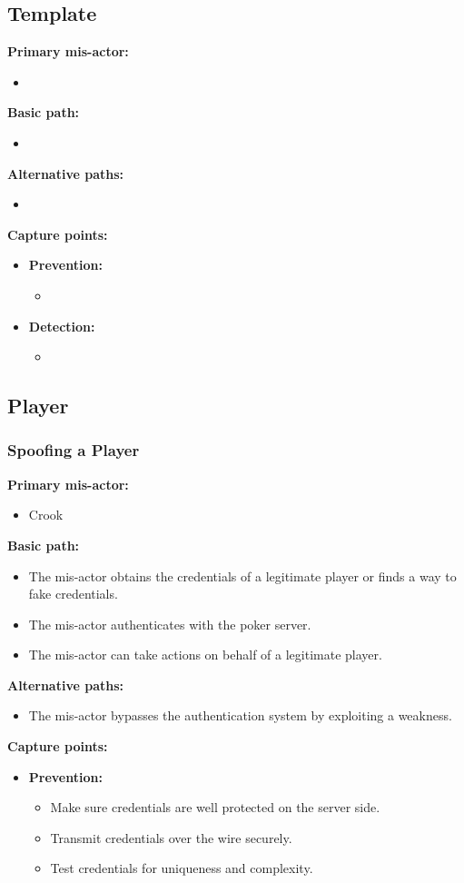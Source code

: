 \documentclass[a4paper,11pt]{report}
\begin{document}
\subsection{Template}
\textbf{Primary mis-actor:}
\begin{itemize}
\item 
\end{itemize}
\textbf{Basic path:}
\begin{itemize}
\item 
\end{itemize}
\textbf{Alternative paths:}
\begin{itemize}
\item 
\end{itemize}
\textbf{Capture points:}
\begin{itemize}
\item \textbf{Prevention:}
\begin{itemize}
\item 
\end{itemize}
\item \textbf{Detection:}
\begin{itemize}
\item 
\end{itemize}
\end{itemize}

\subsection{Player}
\subsubsection{Spoofing a Player}
\textbf{Primary mis-actor:}
\begin{itemize}
\item Crook
\end{itemize}
\textbf{Basic path:}
\begin{itemize}
\item The mis-actor obtains the credentials of a legitimate player or finds a way to fake credentials.
\item The mis-actor authenticates with the poker server.
\item The mis-actor can take actions on behalf of a legitimate player.
\end{itemize}
\textbf{Alternative paths:}
\begin{itemize}
\item The mis-actor bypasses the authentication system by exploiting a weakness.
\end{itemize}
\textbf{Capture points:}
\begin{itemize}
\item \textbf{Prevention:}
\begin{itemize}
\item Make sure credentials are well protected on the server side.
\item Transmit credentials over the wire securely.
\item Test credentials for uniqueness and complexity.
\end{itemize}
\end{itemize}
\end{document}
